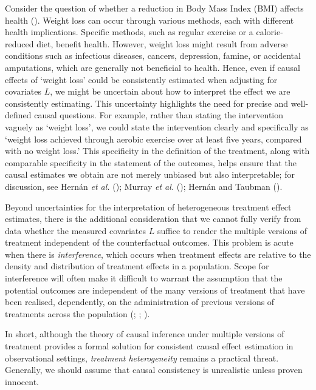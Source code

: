 \documentclass[
  single column]{article}
\begin{document}
Consider the question of whether a reduction in Body Mass Index (BMI)
affects health ().
Weight loss can occur through various methods, each with different
health implications. Specific methods, such as regular exercise or a
calorie-reduced diet, benefit health. However, weight loss might result
from adverse conditions such as infectious diseases, cancers,
depression, famine, or accidental amputations, which are generally not
beneficial to health. Hence, even if causal effects of `weight loss'
could be consistently estimated when adjusting for covariates \(L\), we
might be uncertain about how to interpret the effect we are consistently
estimating. This uncertainty highlights the need for precise and
well-defined causal questions. For example, rather than stating the
intervention vaguely as `weight loss', we could state the intervention
clearly and specifically as `weight loss achieved through aerobic
exercise over at least five years, compared with no weight loss.' This
specificity in the definition of the treatment, along with comparable
specificity in the statement of the outcomes, helps ensure that the
causal estimates we obtain are not merely unbiased but also
interpretable; for discussion, see Hernán \emph{et al.}
(); Murray \emph{et al.}
(); Hernán and Taubman
().

Beyond uncertainties for the interpretation of heterogeneous treatment
effect estimates, there is the additional consideration that we cannot
fully verify from data whether the measured covariates \(L\) suffice to
render the multiple versions of treatment independent of the
counterfactual outcomes. This problem is acute when there is
\emph{interference}, which occurs when treatment effects are relative to
the density and distribution of treatment effects in a population. Scope
for interference will often make it difficult to warrant the assumption
that the potential outcomes are independent of the many versions of
treatment that have been realised, dependently, on the administration of
previous versions of treatments across the population
(;
;
).

In short, although the theory of causal inference under multiple
versions of treatment provides a formal solution for consistent causal
effect estimation in observational settings, \emph{treatment
heterogeneity} remains a practical threat. Generally, we should assume
that causal consistency is unrealistic unless proven innocent.
\end{document}
